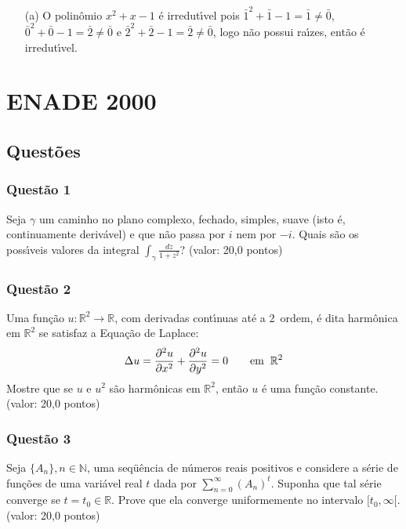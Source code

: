 \documentclass{report}
\begin{document}
\begin{enumerate}

\item[(a)] O polinômio $x^2+x-1$ \'e irredut\'\i vel pois $\bar 1^2+\bar 1 -1=\bar 1 \neq \bar 0$, $\bar 0^2+\bar 0-1=\bar 2\neq \bar 0$ e $\bar 2^2+\bar 2-1=\bar 2 \neq \bar 0$, logo n\~ao possui ra\'\i zes, ent\~ao \'e irredut\'\i vel.

\end{enumerate}

\chapter{ENADE 2000}

\section{\color{blue} Quest\~oes}

\subsection{\color{blue} Quest\~ao 1}

Seja $\gamma$ um caminho no plano complexo, fechado, simples, suave (isto \'e, continuamente deriv\'avel) e que n\~ao passa por $i$ nem por $-i$. Quais s\~ao os poss\'\i veis valores da integral $\displaystyle \int_\gamma \frac{dz}{1+z^2}$? (valor: 20,0 pontos)

\subsection{\color{blue} Quest\~ao 2}

Uma fun\c c\~ao $u: \mathbb R^2 \to \mathbb R$, com derivadas cont\'\i nuas at\'e a 2\textordfeminine\ ordem, \'e dita harmônica em $\mathbb R^2$ se satisfaz a Equa\c c\~ao de Laplace: $$\Delta u={\partial^2u\over\partial x^2}+{\partial^2u\over\partial y^2}=0 \qquad \rm{em}\;\; \mathbb R^2$$ Mostre que se $u$ e $u^2$ s\~ao harmônicas em $\mathbb R^2$, ent\~ao $u$ \'e uma fun\c c\~ao constante. (valor: 20,0 pontos)

\subsection{\color{blue} Quest\~ao 3}

Seja $\{A_n\}, n\in \mathbb N$, uma seqü\^encia de n\'umeros reais positivos e considere a s\'erie de fun\c c\~oes de uma vari\'avel real $t$ dada por $\displaystyle \sum_{n=0}^\infty (A_n)^t$. Suponha que tal s\'erie converge se $t = t_0 \in \mathbb R$. Prove que ela converge uniformemente no intervalo $[t_0, \infty [$. (valor: 20,0 pontos)
\end{document}
